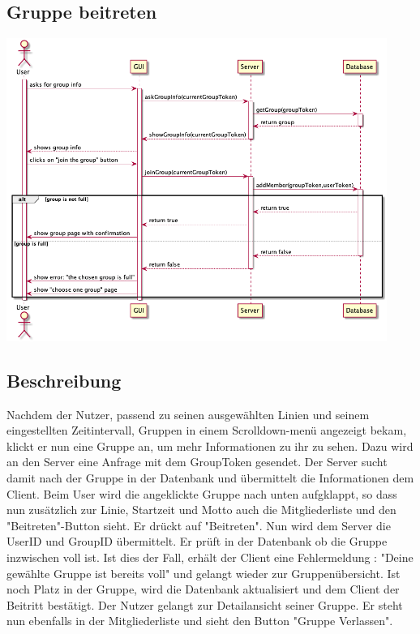 \documentclass[a4paper]{scrreprt}
\begin{document}
\newpage
\subsection{Gruppe beitreten}
\begin{center}
	\includegraphics[width=0.93\textwidth]{Sequenzdiagramme/checkInfoAndJoinGroupSD.png}
\end{center}


\subsection*{Beschreibung}
Nachdem der Nutzer, passend zu seinen ausgewählten Linien und seinem eingestellten Zeitintervall, Gruppen in einem Scrolldown-menü angezeigt bekam, klickt er nun eine Gruppe an, um mehr Informationen zu ihr zu sehen. Dazu wird an den Server eine Anfrage mit dem GroupToken gesendet. Der Server sucht damit nach der Gruppe in der Datenbank und übermittelt die Informationen dem Client. Beim User wird die angeklickte Gruppe nach unten aufgklappt, so dass nun zusätzlich zur Linie, Startzeit und Motto auch die Mitgliederliste und den "Beitreten"-Button sieht. Er drückt auf "Beitreten". Nun wird dem Server die UserID und GroupID übermittelt. Er prüft in der Datenbank ob die Gruppe inzwischen voll ist. Ist dies der Fall, erhält der Client eine Fehlermeldung : "Deine gewählte Gruppe ist bereits voll" und gelangt wieder zur Gruppenübersicht. Ist noch Platz in der Gruppe, wird die Datenbank aktualisiert und dem Client der Beitritt bestätigt. Der Nutzer gelangt zur Detailansicht seiner Gruppe. Er steht nun ebenfalls in der Mitgliederliste und sieht den Button "Gruppe Verlassen".
\end{document}
